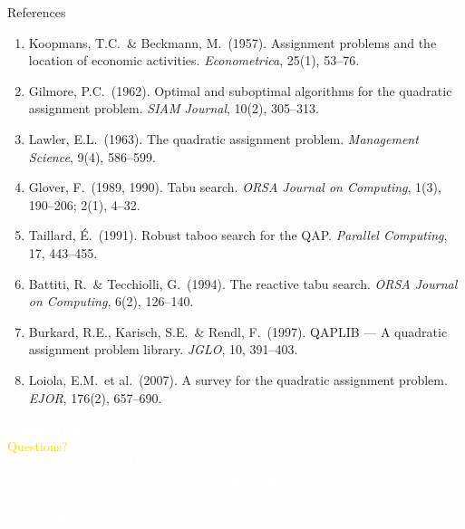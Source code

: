 \documentclass[aspectratio=169,11pt]{beamer}
\begin{document}
\begin{frame}{References}
\small
\begin{enumerate}
  \item Koopmans, T.C.\ \& Beckmann, M.\ (1957).
        Assignment problems and the location of economic activities.
        \emph{Econometrica}, 25(1), 53--76.
  \item Gilmore, P.C.\ (1962).
        Optimal and suboptimal algorithms for the quadratic assignment problem.
        \emph{SIAM Journal}, 10(2), 305--313.
  \item Lawler, E.L.\ (1963).
        The quadratic assignment problem.
        \emph{Management Science}, 9(4), 586--599.
  \item Glover, F.\ (1989, 1990).
        Tabu search.
        \emph{ORSA Journal on Computing}, 1(3), 190--206; 2(1), 4--32.
  \item Taillard, \'E.\ (1991).
        Robust taboo search for the QAP.
        \emph{Parallel Computing}, 17, 443--455.
  \item Battiti, R.\ \& Tecchiolli, G.\ (1994).
        The reactive tabu search.
        \emph{ORSA Journal on Computing}, 6(2), 126--140.
  \item Burkard, R.E., Karisch, S.E.\ \& Rendl, F.\ (1997).
        QAPLIB --- A quadratic assignment problem library.
        \emph{JGLO}, 10, 391--403.
  \item Loiola, E.M.\ et al.\ (2007).
        A survey for the quadratic assignment problem.
        \emph{EJOR}, 176(2), 657--690.
\end{enumerate}
\end{frame}

{
\begin{frame}[plain]
\centering
\vspace{1.5cm}
{\Huge\bfseries\textcolor{white}{Thank You!}}\\[20pt]
{\Large\textcolor{Gold}{Questions?}}\\[30pt]
{\small\textcolor{white}{%
  Md.\ Jakaria Hossain \quad
  Musa Tur Farazi \quad
  Md.\ As-Aid Rahman\\[4pt]
  MD Sajid Mostafiz Noor \quad
  Tausif Rashid \quad
  Awesh Islam\\[12pt]
  CSE 462 --- Algorithm Engineering Lab\\
  March 2026
}}
\end{frame}
}
\end{document}

